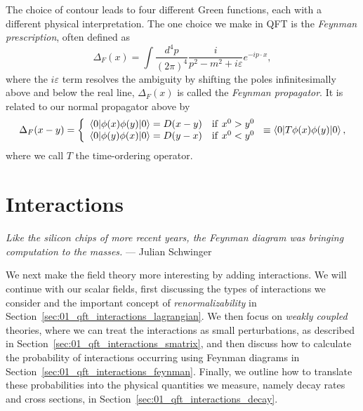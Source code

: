 The choice of contour leads to four different Green functions, each with a different physical interpretation.
The one choice we make in QFT is the \textit{Feynman prescription}, often defined as
\begin{equation}
    \label{eq:01_qft_quantization_feynman_propagator_fourier}
    \Delta_F(x) = \int \frac{d^4p}{(2\pi)^4} \frac{i}{p^2 - m^2 + i\varepsilon} e^{-ip\cdot x},
\end{equation}
where the $i\varepsilon$ term resolves the ambiguity by shifting the poles infinitesimally above and below the real line,  $\Delta_F(x)$ is called the \textit{Feynman propagator}.
It is related to our normal propagator above by
\begin{equation}
    \label{eq:01_qft_quantization_propagator_feynman}
        \Delta_F(x - y) = \left\{
            \begin{array}{ll}
                \braket{0|\phi(x)\phi(y)|0} = D(x - y) & \mathrm{if\ } x^0 > y^0 \\
                \braket{0|\phi(y)\phi(x)|0} = D(y - x) & \mathrm{if\ } x^0 < y^0
            \end{array}
          \right. \equiv \braket{0|T\phi(x)\phi(y)|0},
\end{equation}
where we call $T$ the time-ordering operator.


\section{Interactions}
\label{sec:01_qft_interactions}

\begin{center}
	\centering
	\noindent
	\textit{Like the silicon chips of more recent years, the Feynman diagram was bringing computation to the masses.} --- Julian Schwinger
\end{center}

We next make the field theory more interesting by adding interactions.
We will continue with our scalar fields, first discussing the types of interactions we consider and the important concept of \textit{renormalizability} in Section~\ref{sec:01_qft_interactions_lagrangian}.
We then focus on \textit{weakly coupled} theories, where we can treat the interactions as small perturbations, as described in Section~\ref{sec:01_qft_interactions_smatrix}, and then discuss how to calculate the probability of interactions occurring using Feynman diagrams in Section~\ref{sec:01_qft_interactions_feynman}.
Finally, we outline how to translate these probabilities into the physical quantities we measure, namely decay rates and cross sections, in Section~\ref{sec:01_qft_interactions_decay}.

